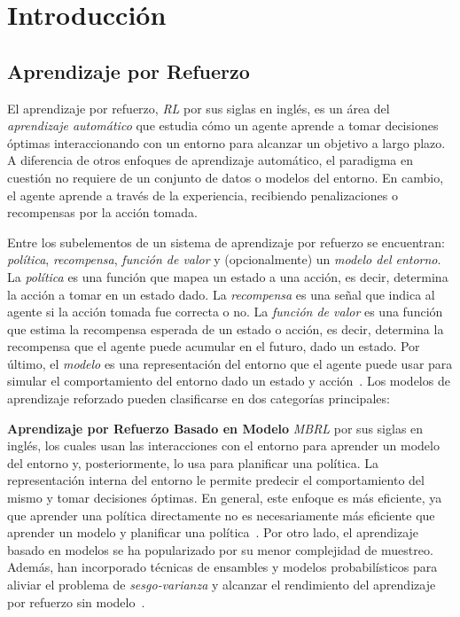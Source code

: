 \section{Introducción}\label{sec:introduccion}

\subsection{Aprendizaje por Refuerzo}\label{subsec:aprendizaje-por-refuerzo}

El aprendizaje por refuerzo, \textit{RL} por sus siglas en inglés, es un área del \textit{aprendizaje automático} que estudia cómo un agente aprende a tomar decisiones óptimas interaccionando con un entorno para alcanzar un objetivo a largo plazo.
A diferencia de otros enfoques de aprendizaje automático, el paradigma en cuestión no requiere de un conjunto de datos o modelos del entorno.
En cambio, el agente aprende a través de la experiencia, recibiendo penalizaciones o recompensas por la acción tomada.

Entre los subelementos de un sistema de aprendizaje por refuerzo se encuentran: \textit{política}, \textit{recompensa}, \textit{función de valor} y (opcionalmente) un \textit{modelo del entorno}.
La \textit{política} es una función que mapea un estado a una acción, es decir, determina la acción a tomar en un estado dado.
La \textit{recompensa} es una señal que indica al agente si la acción tomada fue correcta o no.
La \textit{función de valor} es una función que estima la recompensa esperada de un estado o acción, es decir, determina la recompensa que el agente puede acumular en el futuro, dado un estado.
Por último, el \textit{modelo} es una representación del entorno que el agente puede usar para simular el comportamiento del entorno dado un estado y acción~\cite{Sutton2018}.
Los modelos de aprendizaje reforzado pueden clasificarse en dos categorías principales:

\textbf{Aprendizaje por Refuerzo Basado en Modelo}
\textit{MBRL} por sus siglas en inglés, los cuales usan las interacciones con el entorno para aprender un modelo del entorno y, posteriormente, lo usa para planificar una política.
La representación interna del entorno le permite predecir el comportamiento del mismo y tomar decisiones óptimas.
En general, este enfoque es más eficiente, ya que aprender una política directamente no es necesariamente más eficiente que aprender un modelo y planificar una política~\cite{Sutton2018, benchmarking_2019, YiWan_2022, MuZero_2020}.
Por otro lado, el aprendizaje basado en modelos se ha popularizado por su menor complejidad de muestreo.
Además, han incorporado técnicas de ensambles y modelos probabilísticos para aliviar el problema de \textit{sesgo-varianza} y alcanzar el rendimiento del aprendizaje por refuerzo sin modelo~\cite{benchmarking_2019}.

